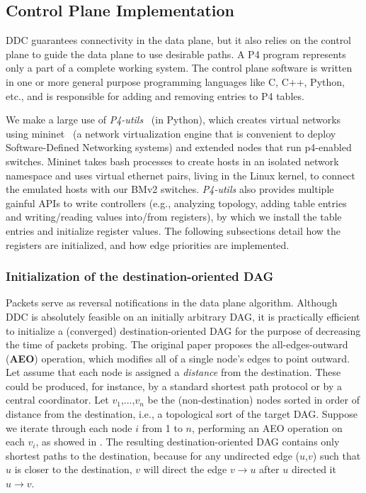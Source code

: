 \subsection{Control Plane Implementation}
\label{sec:control}
DDC guarantees connectivity in the data plane, but it also relies on the control plane to guide the data plane to use desirable paths. A P4 program represents only a part of a complete working system. The control plane software is written in one or more general purpose programming languages like C, C++, Python, etc., and is responsible for adding and removing entries to P4 tables. 

We make a large use of \textit{P4-utils}~\cite{p4-utils} (in Python), which creates virtual networks using mininet~\cite{mininet} (a network virtualization engine that is convenient to deploy Software-Defined Networking systems) and extended nodes that run p4-enabled switches. Mininet takes bash processes to create hosts in an isolated network namespace and uses virtual ethernet pairs, living in the Linux kernel, to connect the emulated hosts with our BMv2 switches. \textit{P4-utils} also provides multiple gainful APIs to write controllers (e.g., analyzing topology, adding table entries and writing/reading values into/from registers), by which we install the table entries and initialize register values. The following subsections detail how the \ld registers are initialized, and how edge priorities are implemented.

\subsubsection{Initialization of the destination-oriented DAG}
Packets serve as reversal notifications in the data plane algorithm. Although DDC is absolutely feasible on an initially arbitrary DAG, it is practically efficient to initialize a (converged) destination-oriented DAG for the purpose of decreasing the time of packets probing. The original paper proposes the all-edges-outward (\textbf{AEO}) operation, which modifies all of a single node’s edges to point outward. Let assume that each node is assigned a \textit{distance} from the destination. These could be produced, for instance, by a standard shortest path protocol or by a central coordinator.  Let $v_1$,...,$v_n$ be the (non-destination) nodes sorted in order of distance from the destination, i.e., a topological sort of the target DAG. Suppose we iterate through each node $i$ from 1 to $n$, performing an AEO operation on each $v_i$, as showed in . The resulting destination-oriented DAG contains only shortest paths to the destination, because for any undirected edge ($u$,$v$) such that $u$ is closer to the destination, $v$ will direct the edge $v \rightarrow u$ after $u$ directed it $u \rightarrow v$.


